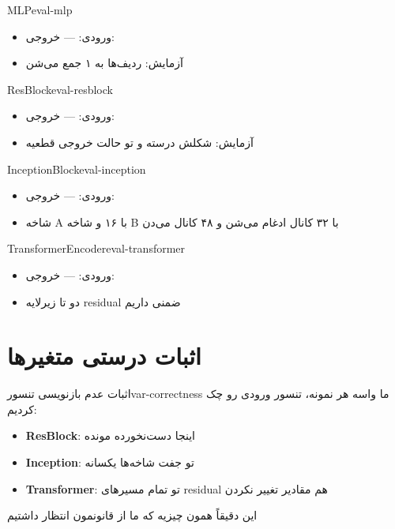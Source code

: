 \documentclass{nngraph-fa}
\begin{document}
\begin{exbox}{MLP}{eval-mlp}
\begin{itemize}[noitemsep]
    \item ورودی:  --- خروجی: 
    \item آزمایش:  ردیف‌ها به ۱ جمع می‌شن
\end{itemize}
\end{exbox}

\begin{exbox}{ResBlock}{eval-resblock}
\begin{itemize}[noitemsep]
    \item ورودی:  --- خروجی: 
    \item آزمایش: شکلش درسته و تو حالت  خروجی قطعیه
\end{itemize}
\end{exbox}

\begin{exbox}{InceptionBlock}{eval-inception}
\begin{itemize}[noitemsep]
    \item ورودی:  --- خروجی: 
    \item شاخه A با ۱۶ و شاخه B با ۳۲ کانال ادغام می‌شن و ۴۸ کانال می‌دن
\end{itemize}
\end{exbox}

\begin{exbox}{TransformerEncoder}{eval-transformer}
\begin{itemize}[noitemsep]
    \item ورودی:  --- خروجی: 
    \item دو تا زیرلایه residual ضمنی داریم
\end{itemize}
\end{exbox}

\section{اثبات درستی متغیرها}

\begin{dfnbox}{اثبات عدم بازنویسی تنسور}{var-correctness}
ما واسه هر نمونه،  تنسور ورودی رو چک کردیم:
\begin{itemize}[noitemsep]
    \item \textbf{ResBlock}: اینجا  دست‌نخورده مونده
    \item \textbf{Inception}: تو جفت شاخه‌ها  یکسانه
    \item \textbf{Transformer}: تو تمام مسیرهای residual هم مقادیر تغییر نکردن
\end{itemize}

این دقیقاً همون چیزیه که ما از قانونمون انتظار داشتیم
\end{dfnbox}
\end{document}
